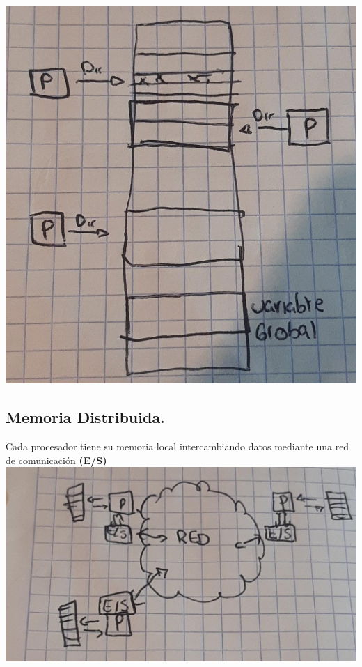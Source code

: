\documentclass[12pt]{article}
\begin{document}
\includegraphics[scale = 0.30]{images/esquema3.jpeg} \\

{\color{blue} \subsection*{\textbf{Memoria Distribuida.}}}
Cada procesador tiene su memoria local intercambiando datos mediante una red de comunicación \textbf{(E/S)}\\

\includegraphics[scale = 0.35]{images/esquema4.jpeg} \\
\end{document}
